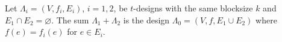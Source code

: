 Let $\Lambda_i = (V, f_i, E_i)$, $i = 1, 2$, be $t$-designs with the same blocksize $k$ and $E_1 \cap E_2 = \varnothing$. The sum $\Lambda_1 + \Lambda_2$ is the design $\Lambda_0 = (V, f, E_1 \cup E_2)$ where $f(e) = f_i(e)$ for $e \in E_i$.
